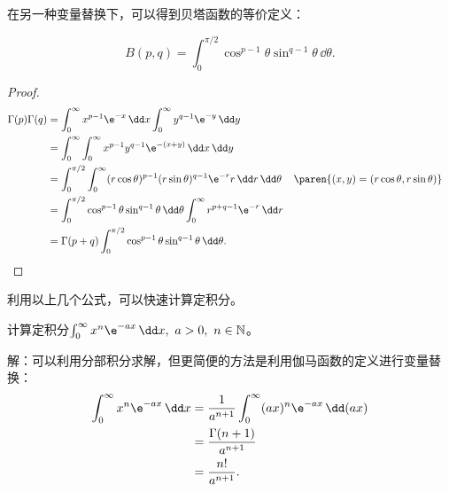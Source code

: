 在另一种变量替换下，可以得到贝塔函数的等价定义：
\begin{definition}[贝塔函数的等价定义]
    \begin{equation}
        B(p,q)=\int_{0}^{\pi/2}\cos^{p-1}\theta\sin^{q-1}\theta\,\dd\theta.
    \end{equation}
\end{definition}

\begin{proof}
    \begin{align}
        \Gamma(p)\Gamma(q)&=\int_{0}^{\infty}x^{p-1}\e^{-x}\,\dd x\int_{0}^{\infty}y^{q-1}\e^{-y}\,\dd y\nonumber\\
        &=\int_{0}^{\infty}\int_{0}^{\infty}x^{p-1}y^{q-1}\e^{-(x+y)}\,\dd x\,\dd y\nonumber\\
        &=\int_{0}^{\pi/2}\int_{0}^{\infty}(r\cos\theta)^{p-1}(r\sin\theta)^{q-1}\e^{-r}r\,\dd r\,\dd\theta&&\paren{(x,y)=(r\cos\theta,r\sin\theta)}\nonumber\\
        &=\int_{0}^{\pi/2}\cos^{p-1}\theta\sin^{q-1}\theta\,\dd\theta\int_{0}^{\infty}r^{p+q-1}\e^{-r}\,\dd r\nonumber\\
        &=\Gamma(p+q)\int_{0}^{\pi/2}\cos^{p-1}\theta\sin^{q-1}\theta\,\dd\theta.
    \end{align}
\end{proof}

利用以上几个公式，可以快速计算定积分。

\begin{example}[伽马函数的变形]
    计算定积分$\int_{0}^{\infty}x^{n}\e^{-ax}\,\dd x,\ a>0,\ n\in\mathbb{N}$。

    解：可以利用分部积分求解，但更简便的方法是利用伽马函数的定义进行变量替换：
    \begin{align}
        \int_{0}^{\infty}x^{n}\e^{-ax}\,\dd x&=\frac{1}{a^{n+1}}\int_{0}^{\infty}(ax)^{n}\e^{-ax}\,\dd(ax)\nonumber\\
        &=\frac{\Gamma(n+1)}{a^{n+1}}\nonumber\\
        &=\frac{n!}{a^{n+1}}.
    \end{align}
\end{example}



